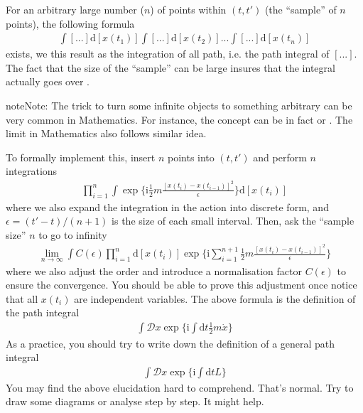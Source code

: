 \documentclass[letterpaper,10pt,english]{sphinxmanual}
\begin{document}
For an arbitrary large number (\(n\)) of points within \((t,t')\) (the ``sample'' of \(n\) points), the following formula
\begin{equation*}
\begin{split}\int [...]\mathrm{d}[x(t_1)] \int [...]\mathrm{d}[x(t_2)] ... \int [...]\mathrm{d}[x(t_n)]\end{split}
\end{equation*}
exists, we  this result as the integration of all path, i.e. the path integral of \([...]\). The fact that the size of the ``sample'' can be  large insures that the integral actually goes over .

\begin{sphinxadmonition}{note}{Note:}
The trick to turn some infinite objects to something arbitrary can be very common in Mathematics. For instance, the concept  can be in fact  or . The limit in Mathematics also follows similar idea.
\end{sphinxadmonition}

To formally implement this, insert \(n\) points into \((t,t')\) and perform \(n\) integrations
\begin{equation*}
\begin{split}\prod_{i=1}^{n}\int\exp\{\mathrm{i}\frac{1}{2}m\frac{[x(t_i)-x(t_{i-1})]^2}{\epsilon}\}\mathrm{d}[x(t_i)]\end{split}
\end{equation*}
where we also expand the integration in the action into discrete form, and \(\epsilon = (t'-t)/(n+1)\) is the size of each small interval. Then, ask the ``sample size'' \(n\) to go to infinity
\begin{equation*}
\begin{split}\lim_{n\rightarrow\infty}\int C(\epsilon)\prod_{i=1}^{n}\mathrm{d}[x(t_i)]\exp\{\mathrm{i}\sum_{i=1}^{n+1}\frac{1}{2}m\frac{[x(t_i)-x(t_{i-1})]^2}{\epsilon}\}\end{split}
\end{equation*}
where we also adjust the order and introduce a normalisation factor \(C(\epsilon)\) to ensure the convergence. You should be able to prove this adjustment once notice that all \(x(t_i)\) are independent variables. The above formula is the definition of the path integral
\begin{equation*}
\begin{split}\int\mathcal{D}x\exp\{\mathrm{i}\int\mathrm{d}t\frac{1}{2}m\dot{x}\}\end{split}
\end{equation*}
As a practice, you should try to write down the definition of a general path integral
\begin{equation*}
\begin{split}\int\mathcal{D}x\exp\{\mathrm{i}\int\mathrm{d}t L\}\end{split}
\end{equation*}
You may find the above elucidation hard to comprehend. That's normal. Try to draw some diagrams or analyse step by step. It might help.
\end{document}
